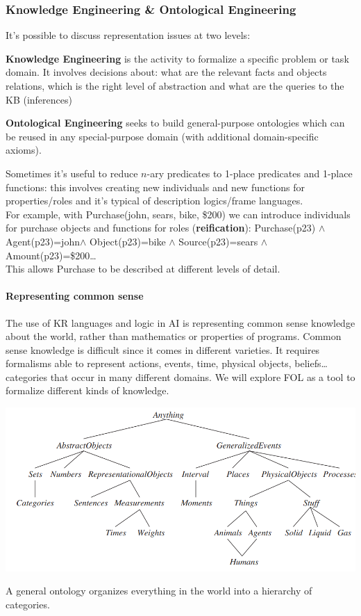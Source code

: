 \documentclass[10pt]{report}
\begin{document}
\subsubsection{Knowledge Engineering \& Ontological Engineering} It's possible to discuss representation issues at two levels:
\begin{list}{}{}
	\item \textbf{Knowledge Engineering} is the activity to formalize a specific problem or task domain. It involves decisions about: what are the relevant facts and objects relations, which is the right level of abstraction and what are the queries to the KB (inferences)
	\item \textbf{Ontological Engineering} seeks to build general-purpose ontologies which can be reused in any special-purpose domain (with additional domain-specific axioms).
\end{list}
Sometimes it's useful to reduce $n$-ary predicates to 1-place predicates and 1-place functions: this involves creating new individuals and new functions for properties/roles and it's typical of description logics/frame languages.\\
For example, with Purchase(john, sears, bike, \$200) we can introduce individuals for purchase objects and functions for roles (\textbf{reification}): Purchase(p23) $\wedge$ Agent(p23)=john$\wedge$ Object(p23)=bike $\wedge$ Source(p23)=sears $\wedge$ Amount(p23)=\$200\ldots\\
This allows Purchase to be described at different levels of detail.
\paragraph{Representing common sense} The use of KR languages and logic in AI is representing common sense knowledge about the world, rather than mathematics or properties of programs. Common sense knowledge is difficult since it comes in different varieties. It requires formalisms able to represent actions, events, time, physical objects, beliefs\ldots categories that occur in many different domains. We will explore FOL as a tool to formalize different kinds of knowledge.
\begin{center}
	\includegraphics[scale=0.5]{12.png}
\end{center}
A general ontology organizes everything in the world into a hierarchy of categories.
\end{document}
